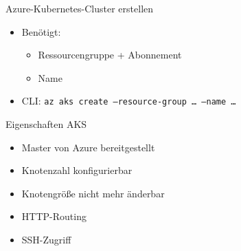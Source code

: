 \begin{flashcard}[Definition]{Azure-Kubernetes-Cluster erstellen}
    \begin{itemize}
        \item Benötigt:
            \begin{itemize}
                \item Ressourcengruppe + Abonnement
                \item Name
            \end{itemize}
        \item CLI:\newline
            \texttt{az aks create --resource-group \ldots\ --name \ldots}
    \end{itemize}
\end{flashcard}

\begin{flashcard}[Definition]{Eigenschaften AKS}
    \begin{itemize}
        \item Master von Azure bereitgestellt
        \item Knotenzahl konfigurierbar
        \item[!] Knotengröße nicht mehr änderbar
        \item HTTP-Routing
        \item SSH-Zugriff
    \end{itemize}
\end{flashcard}



